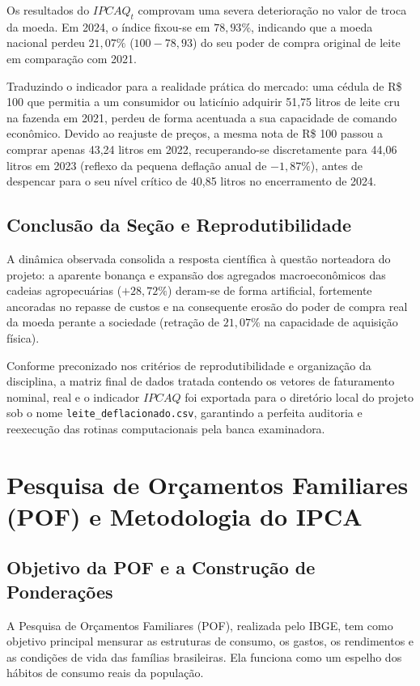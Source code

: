 \documentclass[12pt,a4paper]{article}
\begin{document}
Os resultados do $IPCAQ_t$ comprovam uma severa deterioração no valor de troca da moeda. Em 2024, o índice fixou-se em $78,93\%$, indicando que a moeda nacional perdeu \textbf{$21,07\%$} ($100 - 78,93$) do seu poder de compra original de leite em comparação com 2021. 

Traduzindo o indicador para a realidade prática do mercado: uma cédula de R\$ 100 que permitia a um consumidor ou laticínio adquirir 51,75 litros de leite cru na fazenda em 2021, perdeu de forma acentuada a sua capacidade de comando econômico. Devido ao reajuste de preços, a mesma nota de R\$ 100 passou a comprar apenas 43,24 litros em 2022, recuperando-se discretamente para 44,06 litros em 2023 (reflexo da pequena deflação anual de $-1,87\%$), antes de despencar para o seu nível crítico de 40,85 litros no encerramento de 2024.

\subsection{Conclusão da Seção e Reprodutibilidade}

A dinâmica observada consolida a resposta científica à questão norteadora do projeto: a aparente bonança e expansão dos agregados macroeconômicos das cadeias agropecuárias ($+28,72\%$) deram-se de forma artificial, fortemente ancoradas no repasse de custos e na consequente erosão do poder de compra real da moeda perante a sociedade (retração de $21,07\%$ na capacidade de aquisição física). 

Conforme preconizado nos critérios de reprodutibilidade e organização da disciplina, a matriz final de dados tratada contendo os vetores de faturamento nominal, real e o indicador $IPCAQ$ foi exportada para o diretório local do projeto sob o nome \texttt{leite\_deflacionado.csv}, garantindo a perfeita auditoria e reexecução das rotinas computacionais pela banca examinadora.

\section{Pesquisa de Orçamentos Familiares (POF) e Metodologia do IPCA}
\label{sec:pof_metodologia}

\subsection{Objetivo da POF e a Construção de Ponderações}
A Pesquisa de Orçamentos Familiares (POF), realizada pelo IBGE, tem como objetivo principal mensurar as estruturas de consumo, os gastos, os rendimentos e as condições de vida das famílias brasileiras. Ela funciona como um espelho dos hábitos de consumo reais da população.
\end{document}

